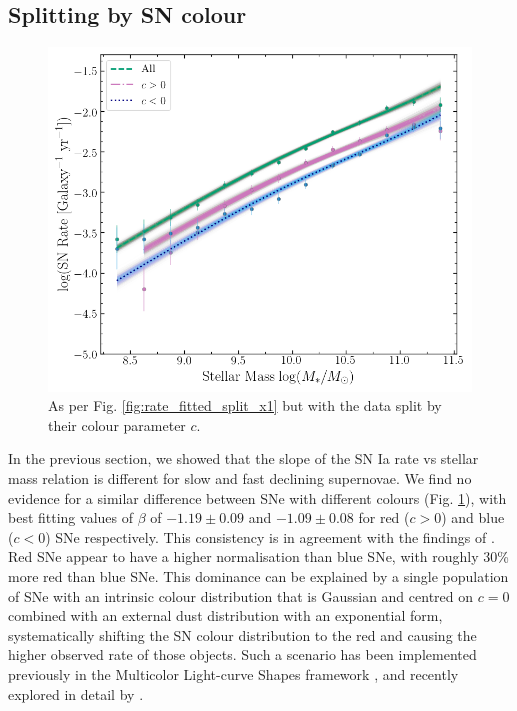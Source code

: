 \documentclass[fleqn,usenatbib]{mnras}
\begin{document}
\subsection{Splitting by SN colour \label{subsec:split_c}}
\begin{figure}
    \centering
    \includegraphics[width=.5\textwidth]{figs/rate_vs_mass_DTD_fit_beta_norm_Qerf1.1_split_c.png}
    \caption{As per Fig. \ref{fig:rate_fitted_split_x1} but with the data split by their colour parameter $c$.%
    \label{fig:rate_fitted_split_c}}
\end{figure}

In the previous section, we showed that the slope of the SN Ia rate vs stellar mass relation is different for slow and fast declining supernovae. We find no evidence for a similar difference between SNe with different colours (Fig. \ref{fig:rate_fitted_split_c}), with best fitting values of $\beta$ of $-1.19\pm0.09$ and $-1.09\pm0.08$ for red ($c > 0$) and blue ($c<0$) SNe respectively. This consistency is in agreement with the findings of \citet{Sullivan2010}. Red SNe appear to have a higher normalisation than blue SNe, with roughly 30\% more red than blue SNe. This dominance can be explained by a single population of SNe with an intrinsic colour distribution that is Gaussian and centred on $c=0$ combined with an external dust distribution with an exponential form, systematically shifting the SN colour distribution to the red and causing the higher observed rate of those objects. Such a scenario has been implemented previously in the Multicolor Light-curve Shapes framework \citep{Riess1996,Jha2007}, and recently explored in detail by \citet{Brout2020}. 
\end{document}
